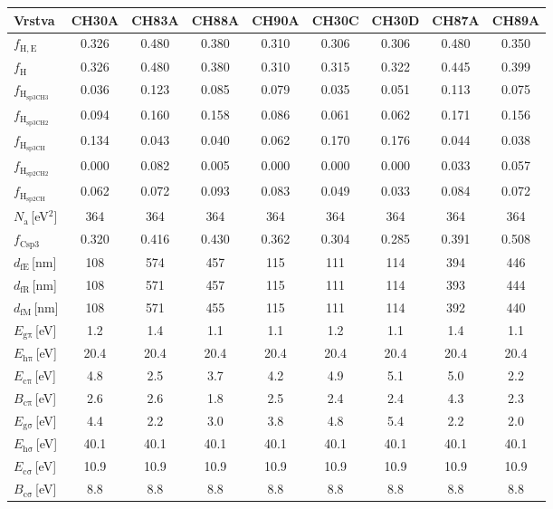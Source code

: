 \begin{tabular}{lcccccccc}
\hline
Vrstva & CH30A & CH83A & CH88A & CH90A & CH30C & CH30D & CH87A & CH89A\\
\hline\hline
$f_\mathrm{H,E}$ & 0.326 & 0.480 & 0.380 & 0.310 & 0.306 & 0.306 & 0.480 & 0.350\\
$f_\mathrm{H}$ & 0.326 & 0.480 & 0.380 & 0.310 & 0.315 & 0.322 & 0.445 & 0.399\\
$f_\mathrm{H_{sp3CH3}}$ & 0.036 & 0.123 & 0.085 & 0.079 & 0.035 & 0.051 & 0.113 & 0.075\\
$f_\mathrm{H_{sp3CH2}}$ & 0.094 & 0.160 & 0.158 & 0.086 & 0.061 & 0.062 & 0.171 & 0.156\\
$f_\mathrm{H_{sp3CH}}$ & 0.134 & 0.043 & 0.040 & 0.062 & 0.170 & 0.176 & 0.044 & 0.038\\
$f_\mathrm{H_{sp2CH2}}$ & 0.000 & 0.082 & 0.005 & 0.000 & 0.000 & 0.000 & 0.033 & 0.057\\
$f_\mathrm{H_{sp2CH}}$ & 0.062 & 0.072 & 0.093 & 0.083 & 0.049 & 0.033 & 0.084 & 0.072\\
\hline
$N_\mathrm{a}$\,[eV$^2$] & 364 & 364 & 364 & 364 & 364 & 364 & 364 & 364\\
$f_\mathrm{Csp3}$ & 0.320 & 0.416 & 0.430 & 0.362 & 0.304 & 0.285 & 0.391 & 0.508\\
$d_\mathrm{fE}$\,[nm] & 108 & 574 & 457 & 115 & 111 & 114 & 394 & 446\\
$d_\mathrm{fR}$\,[nm] & 108 & 571 & 457 & 115 & 111 & 114 & 393 & 444\\
$d_\mathrm{fM}$\,[nm] & 108 & 571 & 455 & 115 & 111 & 114 & 392 & 440\\
$E_\mathrm{g\pi}$\,[eV] & 1.2 & 1.4 & 1.1 & 1.1 & 1.2 & 1.1 & 1.4 & 1.1\\
$E_\mathrm{h\pi}$\,[eV] & 20.4 & 20.4 & 20.4 & 20.4 & 20.4 & 20.4 & 20.4 & 20.4\\
$E_\mathrm{c\pi}$\,[eV] & 4.8 & 2.5 & 3.7 & 4.2 & 4.9 & 5.1 & 5.0 & 2.2\\
$B_\mathrm{c\pi}$\,[eV] & 2.6 & 2.6 & 1.8 & 2.5 & 2.4 & 2.4 & 4.3 & 2.3\\
$E_\mathrm{g\sigma}$\,[eV] & 4.4 & 2.2 & 3.0 & 3.8 & 4.8 & 5.4 & 2.2 & 2.0\\
$E_\mathrm{h\sigma}$\,[eV] & 40.1 & 40.1 & 40.1 & 40.1 & 40.1 & 40.1 & 40.1 & 40.1\\
$E_\mathrm{c\sigma}$\,[eV] & 10.9 & 10.9 & 10.9 & 10.9 & 10.9 & 10.9 & 10.9 & 10.9\\
$B_\mathrm{c\sigma}$\,[eV] & 8.8 & 8.8 & 8.8 & 8.8 & 8.8 & 8.8 & 8.8 & 8.8\\

\end{tabular}
